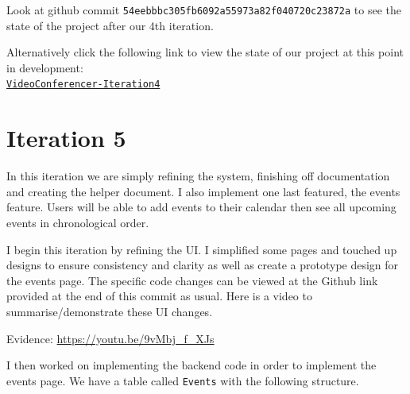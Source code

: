Look at github commit \texttt{54eebbbc305fb6092a55973a82f040720c23872a} to see the state
of the project after our 4th iteration. \\ \vspace{0.2cm}

Alternatively click the following link to view the state of our project at this point in
development: \\
\href{https://github.com/zzzNathan/Video-Conferencer/tree/54eebbbc305fb6092a55973a82f040720c23872a}{\texttt{VideoConferencer-Iteration4}}

\section{Iteration 5}

In this iteration we are simply refining the system, finishing off documentation and creating the
helper document. I also implement one last featured, the events feature. Users will be able to add
events to their calendar then see all upcoming events in chronological order.
\\ \vspace{0.2cm}

I begin this iteration by refining the UI. I simplified some pages and touched up
designs to ensure consistency and clarity as well as create a prototype design for the events page.
The specific code changes can be viewed at the Github link provided at the end of this commit as usual.
Here is a video to summarise/demonstrate these UI changes. \\ \vspace{0.2cm}

{\sffamily Evidence:} \url{https://youtu.be/9vMbj_f_XJs} \\ \vspace{0.2cm}

I then worked on implementing the backend code in order to implement the events page. We have a table called
\texttt{Events} with the following structure. \\ \vspace{0.2cm}

\begin{center}
\end{center}

